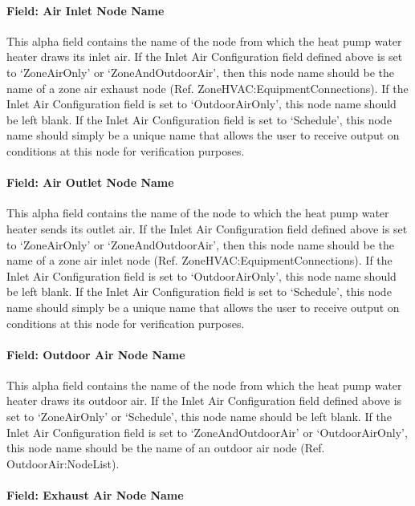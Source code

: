 \paragraph{Field: Air Inlet Node Name}\label{field-air-inlet-node-name-1-006}

This alpha field contains the name of the node from which the heat pump water heater draws its inlet air. If the Inlet Air Configuration field defined above is set to `ZoneAirOnly' or `ZoneAndOutdoorAir', then this node name should be the name of a zone air exhaust node (Ref. ZoneHVAC:EquipmentConnections). If the Inlet Air Configuration field is set to `OutdoorAirOnly', this node name should be left blank. If the Inlet Air Configuration field is set to `Schedule', this node name should simply be a unique name that allows the user to receive output on conditions at this node for verification purposes.

\paragraph{Field: Air Outlet Node Name}\label{field-air-outlet-node-name-1-005}

This alpha field contains the name of the node to which the heat pump water heater sends its outlet air. If the Inlet Air Configuration field defined above is set to `ZoneAirOnly' or `ZoneAndOutdoorAir', then this node name should be the name of a zone air inlet node (Ref. ZoneHVAC:EquipmentConnections). If the Inlet Air Configuration field is set to `OutdoorAirOnly', this node name should be left blank. If the Inlet Air Configuration field is set to `Schedule', this node name should simply be a unique name that allows the user to receive output on conditions at this node for verification purposes.

\paragraph{Field: Outdoor Air Node Name}\label{field-outdoor-air-node-name-1}

This alpha field contains the name of the node from which the heat pump water heater draws its outdoor air. If the Inlet Air Configuration field defined above is set to `ZoneAirOnly' or `Schedule', this node name should be left blank. If the Inlet Air Configuration field is set to `ZoneAndOutdoorAir' or `OutdoorAirOnly', this node name should be the name of an outdoor air node (Ref. OutdoorAir:NodeList).

\paragraph{Field: Exhaust Air Node Name}\label{field-exhaust-air-node-name-1}

